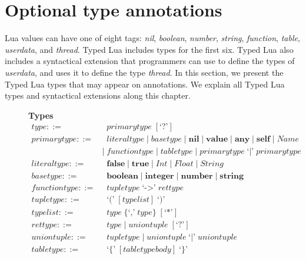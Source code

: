 \section{Optional type annotations}
\label{sec:annotations}

Lua values can have one of eight tags:
\emph{nil}, \emph{boolean}, \emph{number}, \emph{string},
\emph{function}, \emph{table}, \emph{userdata}, and \emph{thread}.
Typed Lua includes types for the first six.
Typed Lua also includes a syntactical extension that programmers can use
to define the types of \emph{userdata}, and uses it to define the type \emph{thread}. 
In this section, we present the Typed Lua types that may appear on annotations.
We explain all Typed Lua types and syntactical extensions along this chapter.

\begin{figure}[!ht]
\textbf{Types}\\
\dstart
\begin{align*}
\textit{type} ::= & \;\; \textit{primarytype} \; [\texttt{`?'}]\\
\textit{primarytype} ::= & \;\; \textit{literaltype} \; | \;
  \textit{basetype} \; | \;
  \textbf{nil} \; | \;
  \textbf{value} \; | \;
  \textbf{any} \; | \;
  \textbf{self} \; | \;
  \textit{Name}\\
& | \; \textit{functiontype} \; | \;
  \textit{tabletype} \; | \;
  \textit{primarytype} \; \texttt{`|'} \; \textit{primarytype}\\
\textit{literaltype} ::= & \;\; \textbf{false} \; | \;
  \textbf{true} \; | \;
  \textit{Int} \; | \;
  \textit{Float} \; | \;
  \textit{String}\\
\textit{basetype} ::= & \;\; \textbf{boolean} \; | \;
  \textbf{integer} \; | \;
  \textbf{number} \; | \;
  \textbf{string}\\
\textit{functiontype} ::= & \;\; \textit{tupletype} \; \texttt{`->'} \; \textit{rettype}\\
\textit{tupletype} ::= & \;\; \texttt{`('} \; [typelist] \; \texttt{`)'}\\
\textit{typelist} ::= & \;\; \textit{type} \; \{\texttt{`,'} \; \textit{type}\} \; [\texttt{`*'}]\\
\textit{rettype} ::= & \;\; \textit{type} \; | \;
  \textit{uniontuple} \; [\texttt{`?'}]\\
\textit{uniontuple} ::= & \;\; \textit{tupletype} \; | \;
  \textit{uniontuple} \; \texttt{`|'} \; \textit{uniontuple}\\
\textit{tabletype} ::= & \;\; \texttt{`\{'} \; [\textit{tabletypebody}] \; \texttt{`\}'}\\

\end{align*}
\end{figure}
